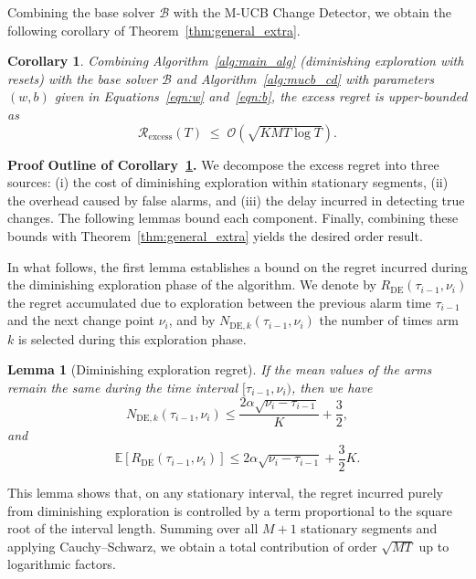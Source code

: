 \documentclass[twoside]{article}
\newcommand{\E}{\mathbb{E}}
\theoremstyle{plain}
\newtheorem{lemma}[theorem]{Lemma}
\newtheorem{corollary}[theorem]{Corollary}
\theoremstyle{definition}
\theoremstyle{remark}
\def\Rex{\mathcal{R}_{\mathrm{excess}}}
\begin{document}
Combining the base solver $\mathcal{B}$ with the M-UCB Change Detector, 
we obtain the following corollary of Theorem~\ref{thm:general_extra}.

\begin{corollary}\label{cor:onestate_ucb_mucb}
Combining Algorithm~\ref{alg:main_alg} (diminishing exploration with resets) 
with the base solver $\mathcal{B}$ and Algorithm~\ref{alg:mucb_cd} with parameters $(w,b)$ given in Equations~\ref{eqn:w} and~\ref{eqn:b}, 
the excess regret is upper-bounded as
\begin{equation}
    \Rex(T)
    \;\le\;
    \mathcal{O}\!\left(\sqrt{KMT\log T}\right).
\end{equation}
\end{corollary}
\vspace{-10pt}
\textbf{Proof Outline of Corollary~\ref{cor:onestate_ucb_mucb}.}
We decompose the excess regret into three sources: (i) the cost of diminishing exploration within stationary segments, (ii) the overhead caused by false alarms, and (iii) the delay incurred in detecting true changes. The following lemmas bound each component. Finally, combining these bounds with Theorem~\ref{thm:general_extra} yields the desired order result.

In what follows, the first lemma establishes a bound on the regret incurred during the diminishing exploration phase of the algorithm. 
We denote by $R_{\mathrm{DE}}(\tau_{i-1}, \nu_i)$ the regret accumulated due to exploration between the previous alarm time $\tau_{i-1}$ and the next change point $\nu_i$, 
and by $N_{\mathrm{DE},k}(\tau_{i-1}, \nu_i)$ the number of times arm $k$ is selected during this exploration phase.
\begin{lemma}[Diminishing exploration regret]\label{lemma:de_regret}
If the mean values of the arms remain the same during the time interval $[\tau_{i-1}, \nu_{i})$, then we have
\begin{equation}
    N_{\mathrm{DE},k}\left(\tau_{i-1}, \nu_{i}\right)\leq \frac{2\alpha\sqrt{\nu_{i}-\tau_{i-1}}}{K}+\frac{3}{2},
\end{equation}
and
\begin{equation}
    \E\left[R_{\mathrm{DE}}\left(\tau_{i-1}, \nu_{i}\right)\right]\leq 2\alpha\sqrt{\nu_{i}-\tau_{i-1}}+\frac{3}{2}K.
\end{equation}
\end{lemma}
\vspace{-10pt}
This lemma shows that, on any stationary interval, the regret incurred purely from diminishing exploration is controlled by a term proportional to the square root of the interval length. Summing over all $M{+}1$ stationary segments and applying Cauchy–Schwarz, we obtain a total contribution of order $\sqrt{MT}$ up to logarithmic factors.
\end{document}
